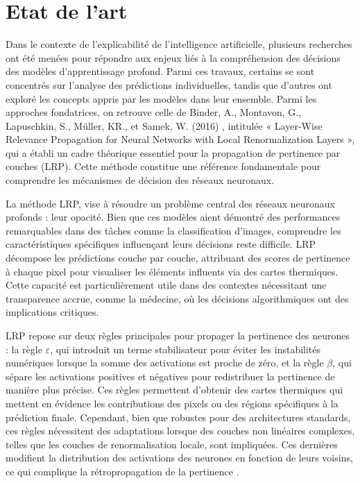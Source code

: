 \documentclass[runningheads]{llncs}
\begin{document}
\section{Etat de l'art}

Dans le contexte de l’explicabilité de l’intelligence artificielle, plusieurs recherches ont été menées pour répondre aux enjeux liés à la compréhension des décisions des modèles d’apprentissage profond. Parmi ces travaux, certains se sont concentrés sur l’analyse des prédictions individuelles, tandis que d’autres ont exploré les concepts appris par les modèles dans leur ensemble. Parmi les approches fondatrices, on retrouve celle de Binder, A., Montavon, G., Lapuschkin, S., Müller, KR., et Samek, W. (2016) \autocite{binder2016layerwiserelevancepropagationneural}, intitulée « Layer-Wise Relevance Propagation for Neural Networks with Local Renormalization Layers », qui a établi un cadre théorique essentiel pour la propagation de pertinence par couches (LRP). Cette méthode constitue une référence fondamentale pour comprendre les mécanismes de décision des réseaux neuronaux.

La méthode LRP, vise à résoudre un problème central des réseaux neuronaux profonds : leur opacité. Bien que ces modèles aient démontré des performances remarquables dans des tâches comme la classification d'images, comprendre les caractéristiques spécifiques influençant leurs décisions reste difficile. LRP décompose les prédictions couche par couche, attribuant des scores de pertinence à chaque pixel pour visualiser les éléments influents via des cartes thermiques. Cette capacité est particulièrement utile dans des contextes nécessitant une transparence accrue, comme la médecine, où les décisions algorithmiques ont des implications critiques.

LRP repose sur deux règles principales pour propager la pertinence des neurones : la règle $\varepsilon$, qui introduit un terme stabilisateur pour éviter les instabilités numériques lorsque la somme des activations est proche de zéro, et la règle $\beta$, qui sépare les activations positives et négatives pour redistribuer la pertinence de manière plus précise. Ces règles permettent d'obtenir des cartes thermiques qui mettent en évidence les contributions des pixels ou des régions spécifiques à la prédiction finale. Cependant, bien que robustes pour des architectures standards, ces règles nécessitent des adaptations lorsque des couches non linéaires complexes, telles que les couches de renormalisation locale, sont impliquées. Ces dernières modifient la distribution des activations des neurones en fonction de leurs voisins, ce qui complique la rétropropagation de la pertinence \autocite{binder2016layerwiserelevancepropagationneural}.
\end{document}
